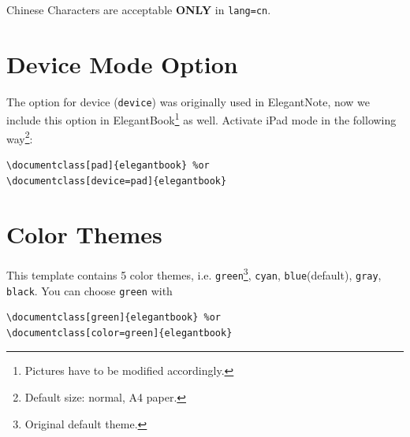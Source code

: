 \documentclass[11pt]{elegantbook}
\begin{document}
\begin{remark}
Chinese Characters  are acceptable \textbf{ONLY} in \lstinline{lang=cn}.
\end{remark}

\section{Device Mode Option}
The option for device (\lstinline{device}) was originally used in ElegantNote, now we include this option in ElegantBook\footnote{Pictures have to be modified accordingly.} as well. Activate iPad mode in the following way\footnote{Default size: normal, A4 paper.}:
\begin{lstlisting}
\documentclass[pad]{elegantbook} %or
\documentclass[device=pad]{elegantbook}
\end{lstlisting}

\section{Color Themes}
This template contains 5 color themes, i.e. \textcolor{structure1}{\lstinline{green}}\footnote{Original default theme.}, \textcolor{structure2}{\lstinline{cyan}}, \textcolor{structure3}{\lstinline{blue}}(default), \textcolor{structure4}{\lstinline{gray}}, \textcolor{structure5}{\lstinline{black}}. You can choose \lstinline{green} with
\begin{lstlisting}
\documentclass[green]{elegantbook} %or
\documentclass[color=green]{elegantbook}
\end{lstlisting}
\end{document}
